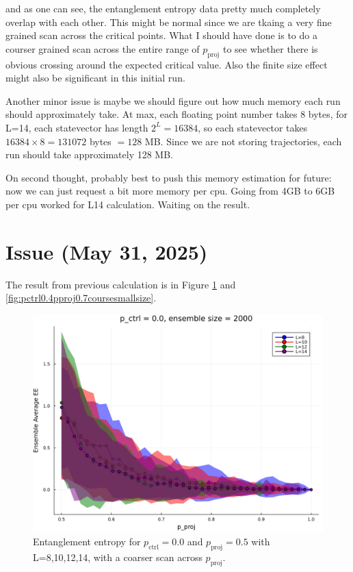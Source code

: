 \documentclass[11pt,a4paper]{article}
\begin{document}
and as one can see, the entanglement entropy data pretty much completely overlap with each other. This might be normal since we are tkaing a very fine grained scan across the critical points. What I should have done is to do a courser grained scan across the entire range of $p_\text{proj}$ to see whether there is obvious crossing around the expected critical value. Also the finite size effect might also be significant in this initial run.

\par Another minor issue is maybe we should figure out how much memory each run should approximately take. At max, each floating point number takes 8 bytes, for L=14, each statevector has length $2^L = 16384$, so each statevector takes $16384 \times 8 = 131072$ bytes $= 128$ MB. Since we are not storing trajectories, each run should take approximately 128 MB. 

\par On second thought, probably best to push this memory estimation for future: now we can just request a bit more memory per cpu. Going from 4GB to 6GB per cpu worked for L14 calculation. Waiting on the result.

\section{Issue (May 31, 2025)}

The result from previous calculation is in Figure \ref{fig:pctrl0.0pproj0.5coursesmallsize} and \ref{fig:pctrl0.4pproj0.7coursesmallsize}.

\begin{figure}[H]
    \centering
    \includegraphics[width=0.8\linewidth]{pctrl0.0pproj0.5coursesmallsize.png}
    \caption{Entanglement entropy for $p_\text{ctrl}=0.0$ and $p_\text{proj}=0.5$ with L=8,10,12,14, with a coarser scan across $p_\text{proj}$.}
    \label{fig:pctrl0.0pproj0.5coursesmallsize}
\end{figure}
\end{document}
